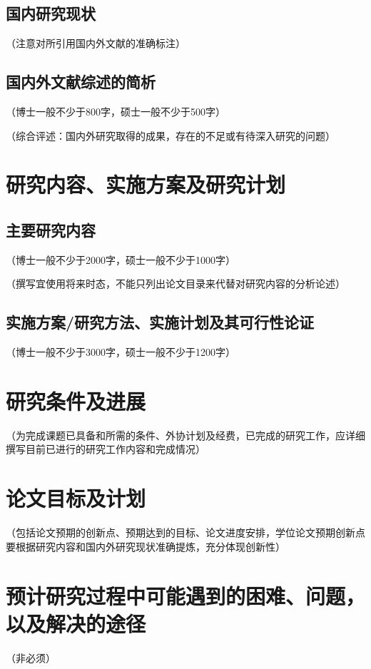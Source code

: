 \documentclass{SYSUReport}
\begin{document}
\subsection{国内研究现状}

（注意对所引用国内外文献的准确标注）

\subsection{国内外文献综述的简析}


（博士一般不少于800字，硕士一般不少于500字）

（综合评述：国内外研究取得的成果，存在的不足或有待深入研究的问题）




\section{研究内容、实施方案及研究计划}


\subsection{主要研究内容}

（博士一般不少于2000字，硕士一般不少于1000字）

（撰写宜使用将来时态，不能只列出论文目录来代替对研究内容的分析论述）

\subsection{实施方案/研究方法、实施计划及其可行性论证}


（博士一般不少于3000字，硕士一般不少于1200字）


\section{研究条件及进展}

（为完成课题已具备和所需的条件、外协计划及经费，已完成的研究工作，应详细撰写目前已进行的研究工作内容和完成情况）


\section{论文目标及计划}

（包括论文预期的创新点、预期达到的目标、论文进度安排，学位论文预期创新点要根据研究内容和国内外研究现状准确提炼，充分体现创新性）


\section{预计研究过程中可能遇到的困难、问题，以及解决的途径}
（非必须）\cite{0Isaac}









\newpage


\end{document}
